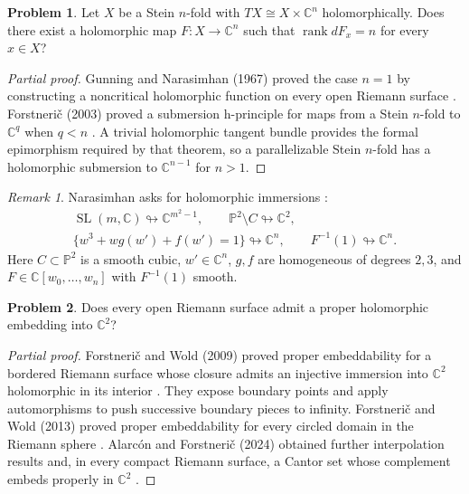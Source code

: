 \documentclass[11pt,reqno]{amsart}
\theoremstyle{definition}
\newtheorem{problem}{Problem}[section]
\theoremstyle{remark}
\newtheorem*{remark}{Remark}
\begin{document}
\begin{problem}\label{b95-9-5-1}\label{b95-9-5-2}\label{b95-9-5-3}\label{b95-9-5-4}\label{b95-11-1-2}
Let $X$ be a Stein $n$-fold with $TX\cong X\times\mathbb C^n$ holomorphically. Does there exist a holomorphic map $F:X\to\mathbb C^n$ such that $\operatorname{rank}dF_x=n$ for every $x\in X$?
\end{problem}
\begin{proof}[Partial proof]
Gunning and Narasimhan (1967) proved the case $n=1$ by constructing a noncritical holomorphic function on every open Riemann surface \cite{SM-GN67}. Forstneri\v c (2003) proved a submersion h-principle for maps from a Stein $n$-fold to $\mathbb C^q$ when $q<n$ \cite{B95-Forstneric}. A trivial holomorphic tangent bundle provides the formal epimorphism required by that theorem, so a parallelizable Stein $n$-fold has a holomorphic submersion to $\mathbb C^{n-1}$ for $n>1$.
\end{proof}
\begin{remark}
Narasimhan asks for holomorphic immersions \cite[Problems~9.5.2--9.5.4, 11.1.2]{B95}:
\[
\begin{gathered}
 \operatorname{SL}(m,\mathbb C)\looparrowright\mathbb C^{m^2-1},
 \qquad \mathbb P^2\setminus C\looparrowright\mathbb C^2,\\
 \{w^3+w g(w')+f(w')=1\}\looparrowright\mathbb C^n,
 \qquad F^{-1}(1)\looparrowright\mathbb C^n.
\end{gathered}
\]
Here $C\subset\mathbb P^2$ is a smooth cubic, $w'\in\mathbb C^n$, $g,f$ are homogeneous of degrees $2,3$, and $F\in\mathbb C[w_0,\ldots,w_n]$ with $F^{-1}(1)$ smooth.
\end{remark}

\begin{problem}\label{Z-embedding}\label{FS-3.16}
Does every open Riemann surface admit a proper holomorphic embedding into $\mathbb C^2$?
\end{problem}
\begin{proof}[Partial proof]
Forstneri\v c and Wold (2009) proved proper embeddability for a bordered Riemann surface whose closure admits an injective immersion into $\mathbb C^2$ holomorphic in its interior \cite{Z-FW2009}. They expose boundary points and apply automorphisms to push successive boundary pieces to infinity. Forstneri\v c and Wold (2013) proved proper embeddability for every circled domain in the Riemann sphere \cite{Z-FW2013}. Alarc\'on and Forstneri\v c (2024) obtained further interpolation results and, in every compact Riemann surface, a Cantor set whose complement embeds properly in $\mathbb C^2$ \cite{Z-AF2024}.
\end{proof}
\end{document}
